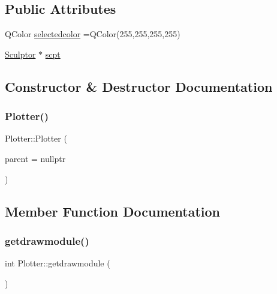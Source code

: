 \subsection*{Public Attributes}
\begin{DoxyCompactItemize}
\item 
Q\+Color \hyperlink{class_plotter_afc5f742a96002ed3c018b006749bd2cf}{selectedcolor} =Q\+Color(255,255,255,255)
\item 
\hyperlink{class_sculptor}{Sculptor} $\ast$ \hyperlink{class_plotter_a314b26fc750a9a2fc37ac7a82b5cece6}{scpt}
\end{DoxyCompactItemize}


\subsection{Constructor \& Destructor Documentation}
\mbox{\label{class_plotter_a1807627530de30ae58dff3c42a823497}} 
\subsubsection{\texorpdfstring{Plotter()}{Plotter()}}
{\footnotesize\ttfamily Plotter\+::\+Plotter (\begin{DoxyParamCaption}\item[{Q\+Widget $\ast$}]{parent = {\ttfamily nullptr} }\end{DoxyParamCaption})\hspace{0.3cm}{\ttfamily [explicit]}}



\subsection{Member Function Documentation}
\mbox{\label{class_plotter_af2eefeff5343cde84639f54612b73338}} 
\subsubsection{\texorpdfstring{getdrawmodule()}{getdrawmodule()}}
{\footnotesize\ttfamily int Plotter\+::getdrawmodule (\begin{DoxyParamCaption}{ }\end{DoxyParamCaption})}

